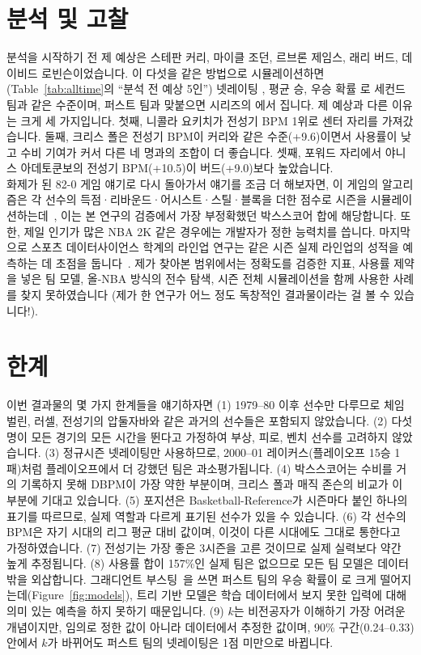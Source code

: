 \documentclass[conference,a4paper]{IEEEtran}
\begin{document}
\section{분석 및 고찰}
분석을 시작하기 전 제 예상은 스테판 커리, 마이클 조던, 르브론 제임스, 래리 버드, 데이비드 로빈슨이었습니다. 이 다섯을 같은 방법으로 시뮬레이션하면(Table~\ref{tab:alltime}의 ``분석 전 예상 5인'') 넷레이팅 \PickTeamRating{}, 평균 \PickTeamWins{}승, 우승 확률 \PickTeamTitle{}로 세컨드 팀과 같은 수준이며, 퍼스트 팀과 맞붙으면 시리즈의 \FirstVsPickSeries{}에서 집니다. 제 예상과 다른 이유는 크게 세 가지입니다. 첫째, 니콜라 요키치가 전성기 BPM 1위로 센터 자리를 가져갔습니다. 둘째, 크리스 폴은 전성기 BPM이 커리와 같은 수준(+9.6)이면서 사용률이 낮고 수비 기여가 커서 다른 네 명과의 조합이 더 좋습니다. 셋째, 포워드 자리에서 야니스 아데토쿤보의 전성기 BPM(+10.5)이 버드(+9.0)보다 높았습니다.\\

화제가 된 82-0 게임 얘기로 다시 돌아가서 얘기를 조금 더 해보자면, 이 게임의 알고리즘은 각 선수의 득점·리바운드·어시스트·스틸·블록을 더한 점수로 시즌을 시뮬레이션하는데~\cite{game820}, 이는 본 연구의 검증에서 가장 부정확했던 박스스코어 합에 해당합니다. 또한, 제일 인기가 많은 NBA 2K 같은 경우에는 개발자가 정한 능력치를 씁니다. 마지막으로 스포츠 데이터사이언스 학계의 라인업 연구는 같은 시즌 실제 라인업의 성적을 예측하는 데 초점을 둡니다~\cite{nba2vec}. 제가 찾아본 범위에서는 정확도를 검증한 지표, 사용률 제약을 넣은 팀 모델, 올-NBA 방식의 전수 탐색, 시즌 전체 시뮬레이션을 함께 사용한 사례를 찾지 못하였습니다 (제가 한 연구가 어느 정도 독창적인 결과물이라는 걸 볼 수 있습니다!).

\section{한계}
이번 결과물의 몇 가지 한계들을 얘기하자면 (1) 1979--80 이후 선수만 다루므로 체임벌린, 러셀, 전성기의 압둘자바와 같은 과거의 선수들은 포함되지 않았습니다. (2) 다섯 명이 모든 경기의 모든 시간을 뛴다고 가정하여 부상, 피로, 벤치 선수를 고려하지 않았습니다. (3) 정규시즌 넷레이팅만 사용하므로, 2000--01 레이커스(플레이오프 15승 1패)처럼 플레이오프에서 더 강했던 팀은 과소평가됩니다. (4) 박스스코어는 수비를 거의 기록하지 못해 DBPM이 가장 약한 부분이며, 크리스 폴과 매직 존슨의 비교가 이 부분에 기대고 있습니다. (5) 포지션은 Basketball-Reference가 시즌마다 붙인 하나의 표기를 따르므로, 실제 역할과 다르게 표기된 선수가 있을 수 있습니다. (6) 각 선수의 BPM은 자기 시대의 리그 평균 대비 값이며, 이것이 다른 시대에도 그대로 통한다고 가정하였습니다. (7) 전성기는 가장 좋은 3시즌을 고른 것이므로 실제 실력보다 약간 높게 추정됩니다. (8) 사용률 합이 157\%인 실제 팀은 없으므로 모든 팀 모델은 데이터 밖을 외삽합니다. 그래디언트 부스팅~\cite{gbm}을 쓰면 퍼스트 팀의 우승 확률이 \BoostingTitleOdds{}로 크게 떨어지는데(Figure~\ref{fig:models}), 트리 기반 모델은 학습 데이터에서 보지 못한 입력에 대해 의미 있는 예측을 하지 못하기 때문입니다. (9) $k$는 비전공자가 이해하기 가장 어려운 개념이지만, 임의로 정한 값이 아니라 데이터에서 추정한 값이며, 90\% 구간(0.24--0.33) 안에서 $k$가 바뀌어도 퍼스트 팀의 넷레이팅은 1점 미만으로 바뀝니다.
\end{document}
